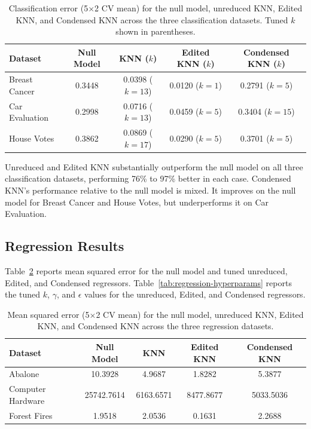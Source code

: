\documentclass[twoside,11pt]{article}
\begin{document}
\begin{table}[h]
    \centering
    \begin{tabular}{lcccc}
    \hline
    Dataset & Null Model & KNN ($k$) & Edited KNN ($k$) & Condensed KNN ($k$) \\
    \hline
    Breast Cancer   & 0.3448 & 0.0398 ($k=13$) & 0.0120 ($k=1$)  & 0.2791 ($k=5$)  \\
    Car Evaluation  & 0.2998 & 0.0716 ($k=13$) & 0.0459 ($k=5$)  & 0.3404 ($k=15$) \\
    House Votes     & 0.3862 & 0.0869 ($k=17$) & 0.0290 ($k=5$)  & 0.3701 ($k=5$)  \\
    \hline
    \end{tabular}
    \caption{Classification error (5$\times$2 CV mean) for the null model, unreduced KNN, Edited KNN, and Condensed KNN across the three classification datasets. Tuned $k$ shown in parentheses.}
    \label{tab:classification-results}
\end{table}
Unreduced and Edited KNN substantially outperform the null model on all three classification datasets, performing 76\% to 97\% better in each case. Condensed KNN's performance relative to the null model is mixed. It improves on the null model for Breast Cancer and House Votes, but underperforms it on Car Evaluation.

\subsection{Regression Results}
Table~\ref{tab:regression-results} reports mean squared error for the null model and tuned unreduced, Edited, and Condensed regressors. Table~\ref{tab:regression-hyperparams} reports the tuned $k$, $\gamma$, and $\epsilon$ values for the unreduced, Edited, and Condensed regressors.

\begin{table}[h]
\centering
\begin{tabular}{lcccc}
\hline
Dataset & Null Model & KNN & Edited KNN & Condensed KNN \\
\hline
Abalone            & 10.3928    & 4.9687    & 1.8282    & 5.3877   \\
Computer Hardware  & 25742.7614 & 6163.6571 & 8477.8677 & 5033.5036 \\
Forest Fires       & 1.9518     & 2.0536    & 0.1631    & 2.2688   \\
\hline
\end{tabular}
\caption{Mean squared error (5$\times$2 CV mean) for the null model, unreduced KNN, Edited KNN, and Condensed KNN across the three regression datasets.}
\label{tab:regression-results}
\end{table}
\end{document}
